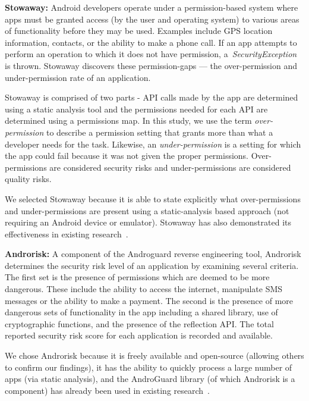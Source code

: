 \textbf{Stowaway:} Android developers operate under a permission-based system where apps must be granted access (by the user and operating system) to various areas of functionality before they may be used. Examples include GPS location information, contacts, or the ability to make a phone call. If an app attempts to perform an operation to which it does not have permission, a~\emph{SecurityException} is thrown. Stowaway discovers these permission-gaps --- the over-permission and under-permission rate of an application.

Stowaway is comprised of two parts - API calls made by the app are determined using a static analysis tool and the permissions needed for each API are determined using a permissions map. In this study, we use the term \emph{over-permission} to describe a permission setting that grants more than what a developer needs for the task. Likewise, an \emph{under-permission} is a setting for which the app could fail because it was not given the proper permissions. Over-permissions are considered security risks and under-permissions are considered quality risks.

We selected Stowaway because it is able to state explicitly what over-permissions and under-permissions are present using a static-analysis based approach (not requiring an Android device or emulator). Stowaway has also demonstrated its effectiveness in existing research~\cite{Felt:2011:APD:2046707.2046779}. %


\textbf{Androrisk:} A component of the Androguard reverse engineering tool, Androrisk determines the security risk level of an application by examining several criteria. The first set is the presence of permissions which are deemed to be more dangerous. These include the ability to access the internet, manipulate SMS messages or the ability to make a payment. The second is the presence of more dangerous sets of functionality in the app including a shared library, use of cryptographic functions, and the presence of the reflection API.
 The total reported security risk score for each application is recorded and available.

We chose Androrisk because it is freely available and open-source (allowing others to confirm our findings), it has the ability to quickly process a large number of apps (via static analysis), and the AndroGuard library (of which Androrisk is a component) has already been used in existing research~\cite{Egele:2013:ESC:2508859.2516693}.




